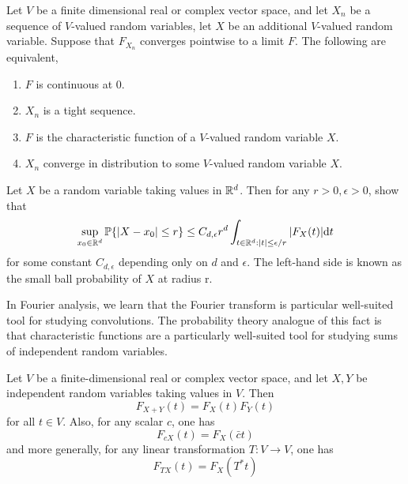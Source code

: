 \begin{proposition}
    Let $V$ be a finite dimensional real or complex vector space, and let $X_n$ be a sequence of $V$-valued random variables, let $X$ be an additional $V$-valued random variable. 
    Suppose that $F_{X_n}$ converges pointwise to a limit $F$. The following are equivalent,
    \begin{enumerate}
        \item $F$ is continuous at 0.
        \item $X_n$ is a tight sequence.
        \item $F$ is the characteristic function of a $V$-valued random variable $X$.
        \item $X_n$ converge in distribution to some $V$-valued random variable $X$.
    \end{enumerate}
\end{proposition}

\begin{proposition}
    \label{Esseen concentration inequality}
    Let $X$ be a random variable taking values in $\mathbb{R}^d$. Then for any $r>0,\epsilon>0$, show that 
    \begin{equation}
        \sup_{x_0 \in \mathbb{R}^d} \mathbb{P}\{|X-x_0| \leq r \} \leq C_{d,\epsilon} r^d \int_{t\in \mathbb{R}^d:|t|\leq \epsilon/r} |F_X(t)| \mathrm{d} t
    \end{equation}
    for some constant $C_{d,\epsilon}$ depending only on $d$ and $\epsilon$. The left-hand side is known as the small ball probability of $X$ at radius r.
\end{proposition}

In Fourier analysis, we learn that the Fourier transform is particular well-suited tool for studying convolutions. The probability theory analogue of this fact is that characteristic functions are a particularly well-suited tool for studying sums of independent random variables.

\begin{proposition}
    Let $V$ be a finite-dimensional real or complex vector space, and let $X,Y$ be independent random variables taking values in $V$. Then
    \begin{equation}\label{Fourier identities}
        F_{X+Y}(t) = F_X(t)F_Y(t)
    \end{equation}
    for all $t\in V$. Also, for any scalar $c$, one has 
    \begin{equation*}
        F_{cX}(t) = F_X (\bar ct)
    \end{equation*}
    and more generally, for any linear transformation $T: V\to V$, one has 
    \begin{equation*}
        F_{TX}(t)=F_X(T^*t)
    \end{equation*}
\end{proposition}

